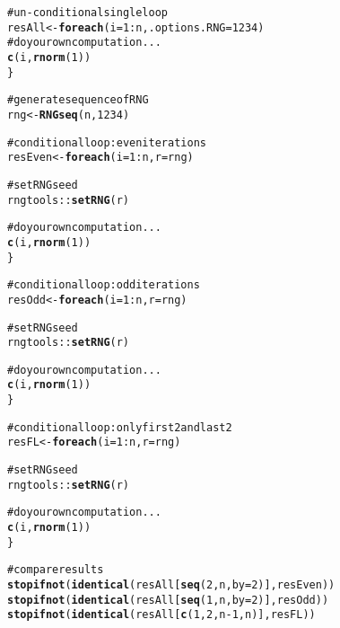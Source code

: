 \documentclass[a4paper,12pt]{article}\usepackage{graphicx, color}
\makeatletter
\newcommand{\hlfunctioncall}[1]{\textcolor[rgb]{0.501960784313725,0,0.329411764705882}{\textbf{#1}}}%
\newcommand{\hlcomment}[1]{\textcolor[rgb]{0.180392156862745,0.6,0.341176470588235}{#1}}%
\newenvironment{kframe}{%
 \def\at@end@of@kframe{}%
 \ifinner\ifhmode%
  \def\at@end@of@kframe{\end{minipage}}%
  \begin{minipage}{\columnwidth}%
 \fi\fi%
 \def\FrameCommand##1{\hskip\@totalleftmargin \hskip-\fboxsep
 \colorbox{shadecolor}{##1}\hskip-\fboxsep
     \hskip-\linewidth \hskip-\@totalleftmargin \hskip\columnwidth}%
 \MakeFramed {\advance\hsize-\width
   \@totalleftmargin\z@ \linewidth\hsize
   \@setminipage}}%
 {\par\unskip\endMakeFramed%
 \at@end@of@kframe}
\newenvironment{knitrout}{}{} %
\renewenvironment{knitrout}{\begin{footnotesize}}{\end{footnotesize}}
\makeatother
\begin{document}
\begin{knitrout}
\color{fgcolor}\begin{kframe}
\begin{alltt}

\hlcomment{# un-conditional single loop}
resAll <- \hlfunctioncall{foreach}(i = 1:n, .options.RNG = 1234) %dorng% \{
\hlcomment{    # do your own computation ...}
    \hlfunctioncall{c}(i, \hlfunctioncall{rnorm}(1))
\}

\hlcomment{# generate sequence of RNG}
rng <- \hlfunctioncall{RNGseq}(n, 1234)

\hlcomment{# conditional loop: even iterations}
resEven <- \hlfunctioncall{foreach}(i = 1:n, r = rng) %:% \hlfunctioncall{when}(i%%2 == 0) %dopar% \{
    
\hlcomment{    # set RNG seed}
    rngtools::\hlfunctioncall{setRNG}(r)
    
\hlcomment{    # do your own computation ...}
    \hlfunctioncall{c}(i, \hlfunctioncall{rnorm}(1))
\}

\hlcomment{# conditional loop: odd iterations}
resOdd <- \hlfunctioncall{foreach}(i = 1:n, r = rng) %:% \hlfunctioncall{when}(i%%2 == 1) %dopar% \{
    
\hlcomment{    # set RNG seed}
    rngtools::\hlfunctioncall{setRNG}(r)
    
\hlcomment{    # do your own computation ...}
    \hlfunctioncall{c}(i, \hlfunctioncall{rnorm}(1))
\}

\hlcomment{# conditional loop: only first 2 and last 2}
resFL <- \hlfunctioncall{foreach}(i = 1:n, r = rng) %:% \hlfunctioncall{when}(i %in% \hlfunctioncall{c}(1, 2, n - 1, n)) %dopar% \{
    
\hlcomment{    # set RNG seed}
    rngtools::\hlfunctioncall{setRNG}(r)
    
\hlcomment{    # do your own computation ...}
    \hlfunctioncall{c}(i, \hlfunctioncall{rnorm}(1))
\}

\hlcomment{# compare results}
\hlfunctioncall{stopifnot}(\hlfunctioncall{identical}(resAll[\hlfunctioncall{seq}(2, n, by = 2)], resEven))
\hlfunctioncall{stopifnot}(\hlfunctioncall{identical}(resAll[\hlfunctioncall{seq}(1, n, by = 2)], resOdd))
\hlfunctioncall{stopifnot}(\hlfunctioncall{identical}(resAll[\hlfunctioncall{c}(1, 2, n - 1, n)], resFL))
\end{alltt}
\end{kframe}
\end{knitrout}
\end{document}
